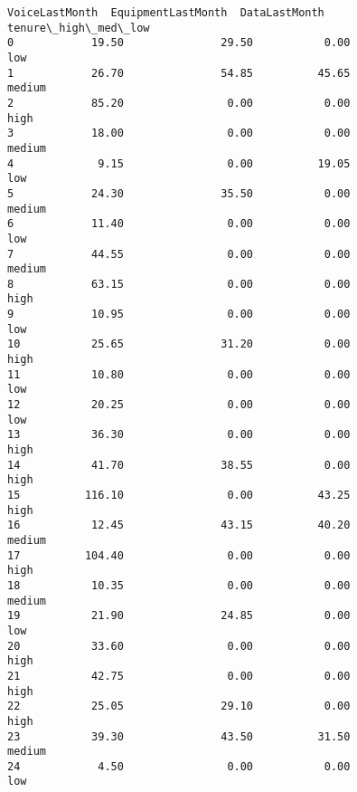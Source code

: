 \documentclass[11pt]{article}
\begin{document}
\begin{Verbatim}[commandchars=\\\{\}]
    VoiceLastMonth  EquipmentLastMonth  DataLastMonth tenure\_high\_med\_low
0            19.50               29.50           0.00                 low
1            26.70               54.85          45.65              medium
2            85.20                0.00           0.00                high
3            18.00                0.00           0.00              medium
4             9.15                0.00          19.05                 low
5            24.30               35.50           0.00              medium
6            11.40                0.00           0.00                 low
7            44.55                0.00           0.00              medium
8            63.15                0.00           0.00                high
9            10.95                0.00           0.00                 low
10           25.65               31.20           0.00                high
11           10.80                0.00           0.00                 low
12           20.25                0.00           0.00                 low
13           36.30                0.00           0.00                high
14           41.70               38.55           0.00                high
15          116.10                0.00          43.25                high
16           12.45               43.15          40.20              medium
17          104.40                0.00           0.00                high
18           10.35                0.00           0.00              medium
19           21.90               24.85           0.00                 low
20           33.60                0.00           0.00                high
21           42.75                0.00           0.00                high
22           25.05               29.10           0.00                high
23           39.30               43.50          31.50              medium
24            4.50                0.00           0.00                 low
    \end{Verbatim}
\end{document}
